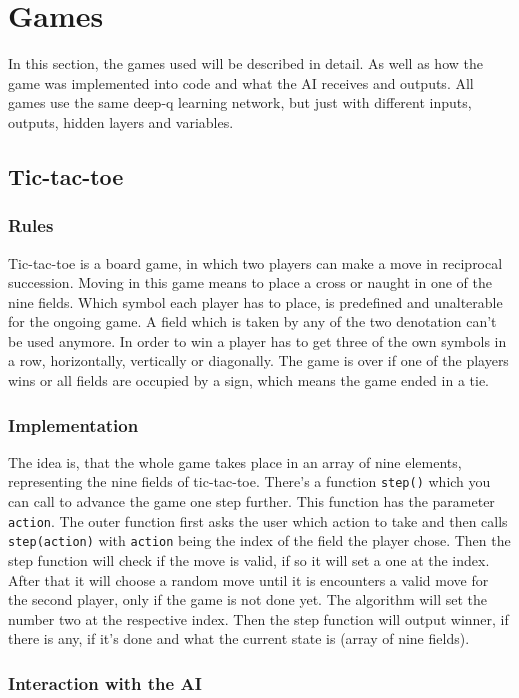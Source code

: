 \documentclass[12pt]{article}
\begin{document}
\section{Games}\label{sec:Games}
In this section, the games used will be described in detail. As well as how the game was implemented into code and what the AI receives and outputs. All games use the same deep-q learning network, but just with different inputs, outputs, hidden layers and variables.
\subsection{Tic-tac-toe}
\subsubsection{Rules}
Tic-tac-toe is a board game, in which two players can make a move in reciprocal succession. Moving in this game means to place a cross or naught in one of the nine fields. Which symbol each player has to place, is predefined and unalterable for the ongoing game. A field which is taken by any of the two denotation can't be used anymore. In order to win a player has to get three of the own symbols in a row, horizontally, vertically or diagonally. The game is over if one of the players wins or all fields are occupied by a sign, which means the game ended in a tie.
\subsubsection{Implementation}
The idea is, that the whole game takes place in an array of nine elements, representing the nine fields of tic-tac-toe. There's a function \lstinline{step()} which you can call to advance the game one step further. This function has the parameter \lstinline{action}. The outer function first asks the user which action to take and then calls \lstinline{step(action)} with \lstinline{action} being the index of the field the player chose. Then the step function will check if the move is valid, if so it will set a one at the index. After that it will choose a random move until it is encounters a valid move for the second player, only if the game is not done yet. The algorithm will set the number two at the respective index. Then the step function will output winner, if there is any, if it's done and what the current state is (array of nine fields).
\subsubsection{Interaction with the AI}
\end{document}
